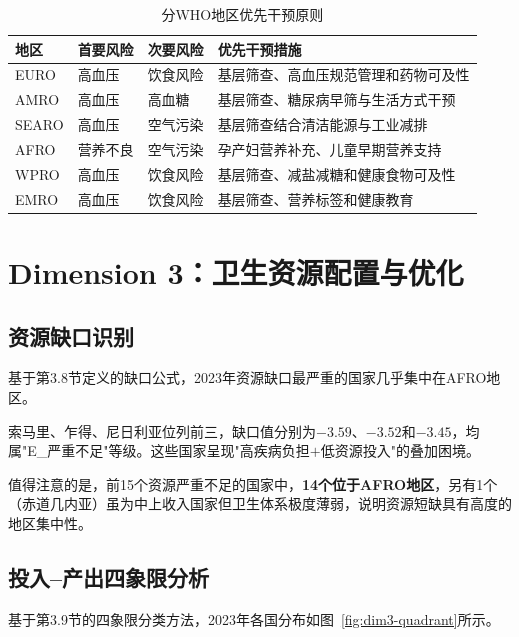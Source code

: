 \documentclass[12pt,a4paper]{ctexart}
\begin{document}
\begin{table}[H]
\centering
\caption{分WHO地区优先干预原则}
\label{tab:intervention}
\begin{tabularx}{\textwidth}{lllX}
\toprule
\textbf{地区} & \textbf{首要风险} & \textbf{次要风险} & \textbf{优先干预措施} \\
\midrule
EURO & 高血压 & 饮食风险 & 基层筛查、高血压规范管理和药物可及性 \\
AMRO & 高血压 & 高血糖 & 基层筛查、糖尿病早筛与生活方式干预 \\
SEARO & 高血压 & 空气污染 & 基层筛查结合清洁能源与工业减排 \\
AFRO & 营养不良 & 空气污染 & 孕产妇营养补充、儿童早期营养支持 \\
WPRO & 高血压 & 饮食风险 & 基层筛查、减盐减糖和健康食物可及性 \\
EMRO & 高血压 & 饮食风险 & 基层筛查、营养标签和健康教育 \\
\bottomrule
\end{tabularx}
\end{table}

\section{Dimension 3：卫生资源配置与优化}

\subsection{资源缺口识别}

基于第3.8节定义的缺口公式，2023年资源缺口最严重的国家几乎集中在AFRO地区。



索马里、乍得、尼日利亚位列前三，缺口值分别为$-3.59$、$-3.52$和$-3.45$，均属"E\_严重不足"等级。这些国家呈现"高疾病负担$+$低资源投入"的叠加困境。

值得注意的是，前15个资源严重不足的国家中，\textbf{14个位于AFRO地区}，另有1个（赤道几内亚）虽为中上收入国家但卫生体系极度薄弱，说明资源短缺具有高度的地区集中性。

\subsection{投入--产出四象限分析}

基于第3.9节的四象限分类方法，2023年各国分布如图~\ref{fig:dim3-quadrant}所示。
\end{document}
